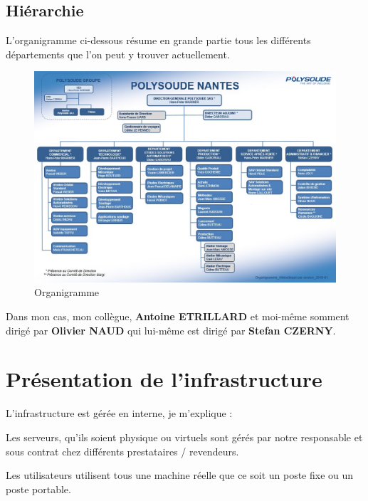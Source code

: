 \documentclass[11pt,a4paper,oneside]{article}
\begin{document}
\subsection{Hiérarchie}
L'organigramme ci-dessous résume en grande partie tous les différents départements que l'on peut y trouver actuellement.
\begin{figure}[h!]
  \centering
  \includegraphics[width=\linewidth]{Ressources/Organigramme.jpg}
  \caption{Organigramme}
\end{figure}

Dans mon cas, mon collègue, \textbf{Antoine ETRILLARD} et moi-même somment dirigé par \textbf{Olivier NAUD} qui lui-même est dirigé par \textbf{Stefan CZERNY}.
\newpage

\section{Présentation de l'infrastructure}
L'infrastructure est gérée en interne, je m'explique :\

Les serveurs, qu'ils soient physique ou virtuels sont gérés par notre responsable et sous contrat chez différents prestataires / revendeurs.

Les utilisateurs utilisent tous une machine réelle que ce soit un poste fixe ou un poste portable.
\end{document}
